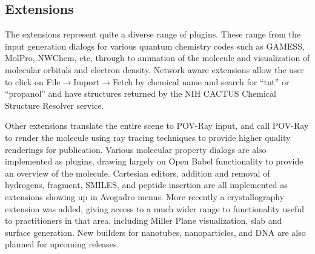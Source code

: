 \documentclass[10pt]{bmc_article}
\newenvironment{bmcformat}{\begin{raggedright}
\baselineskip20pt\sloppy\setboolean{publ}{false}}{\end{raggedright}
\baselineskip20pt\sloppy}
\begin{document}
\begin{bmcformat}
\subsection{Extensions}

The extensions represent quite a diverse range of plugins. These range from the
input generation dialogs for various quantum chemistry codes such as GAMESS,
MolPro, NWChem, etc, through to animation of the molecule and visualization of
molecular orbitals and electron density. Network aware extensions allow the user
to click on File$\to$Import$\to$Fetch by chemical name and search for ``tnt'' or
``propanol'' and have structures returned by the NIH CACTUS Chemical Structure
Resolver service.

Other extensions translate the entire scene to POV-Ray input, and call POV-Ray
to render the molecule using ray tracing techniques to provide higher quality
renderings for publication. Various molecular property dialogs are also
implemented as plugins, drawing largely on Open Babel functionality to provide
an overview of the molecule. Cartesian editors, addition and removal of
hydrogens, fragment, SMILES, and peptide insertion are all implemented as
extensions showing up in Avogadro menus. More recently a crystallography
extension was added, giving access to a much wider range to functionality
useful to practitioners in that area, including Miller Plane
visualization, slab and surface generation. New builders for
nanotubes, nanoparticles, and DNA are also planned for upcoming releases.


\end{bmcformat}
\end{document}
